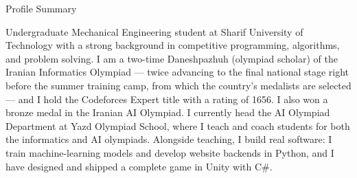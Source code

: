 \begin{section}{Profile Summary}

Undergraduate Mechanical Engineering student at Sharif University of
Technology with a strong background in competitive programming,
algorithms, and problem solving. I am a two-time Daneshpazhuh (olympiad
scholar) of the Iranian Informatics Olympiad --- twice advancing to the
final national stage right before the summer training camp, from which
the country's medalists are selected --- and I hold the Codeforces
Expert title with a rating of 1656. I also won a bronze medal in the
Iranian AI Olympiad. I currently head the AI Olympiad Department at
Yazd Olympiad School, where I teach and coach students for both the
informatics and AI olympiads. Alongside teaching, I build real
software: I train machine-learning models and develop website backends
in Python, and I have designed and shipped a complete game in Unity
with C\#.

\end{section}
